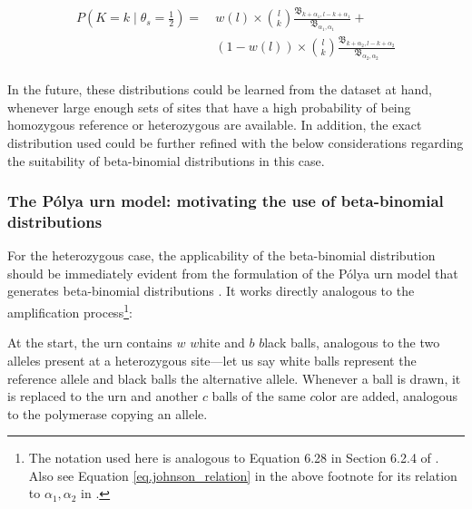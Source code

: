 \documentclass[authoryear,preprint,11pt]{scrartcl}
\newcommand{\Prob}{{P}}
\begin{document}
\begin{equation}
 \label{eq.beta-binomial}
 \begin{split}
  \Prob(K = k \mid \theta_s = \frac{1}{2}) =~ &w(l) \times {l \choose k} \frac{ \mathfrak{B}_{k+\alpha_1,l-k+\alpha_1} }{ \mathfrak{B}_{\alpha_1,\alpha_1} } +\\
  &(1-w(l)) \times {l \choose k} \frac{ \mathfrak{B}_{k+\alpha_2,l-k+\alpha_2} }{ \mathfrak{B}_{\alpha_2,\alpha_2} }\\
 \end{split}
\end{equation}

In the future, these distributions could be learned from the dataset at hand, whenever large enough sets of sites that have a high probability of being homozygous reference or heterozygous are available.
In addition, the exact distribution used could be further refined with the below considerations regarding the suitability of beta-binomial distributions in this case.\\


\subsubsection{The Pólya urn model: motivating the use of beta-binomial distributions}\label{sec:polya-urn}

For the heterozygous case, the applicability of the beta-binomial distribution \citep{irwin_distribution_1954} should be immediately evident from the formulation of the Pólya urn model \citep{eggenberger_uber_1923} that generates beta-binomial distributions \citep{irwin_distribution_1954,johnson_univariate_2005}.
It works directly analogous to the amplification process\footnote{The notation used here is analogous to Equation 6.28 in Section 6.2.4 of \cite{johnson_univariate_2005}. Also see Equation \ref{eq.johnson_relation} in the above footnote for its relation to $\alpha_1, \alpha_2$ in \cite{lodato_somatic_2015}.}:

At the start, the urn contains $w$ $w$hite and $b$ $b$lack balls, analogous to the two alleles present at a heterozygous site---let us say white balls represent the reference allele and black balls the alternative allele.
Whenever a ball is drawn, it is replaced to the urn and another $c$ balls of the same $c$olor are added, analogous to the polymerase copying an allele.
\end{document}
